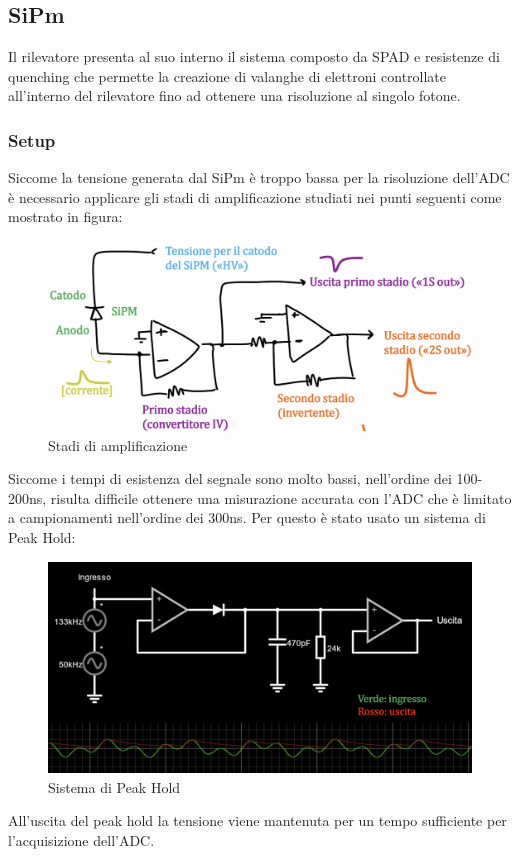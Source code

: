 \pagebreak
\subsection{SiPm}
Il rilevatore presenta al suo interno il sistema composto da SPAD e resistenze di quenching che permette la creazione di valanghe di elettroni controllate all'interno del rilevatore fino ad ottenere una risoluzione al singolo fotone.

\subsubsection{Setup}

Siccome la tensione generata dal SiPm è troppo bassa per la risoluzione dell'ADC è necessario applicare gli stadi di amplificazione studiati nei punti seguenti come mostrato in figura:

\begin{figure}[!h]
    \centering
    \includegraphics[width=0.5\linewidth]{Photomultiplier/assets/SiPm/SiPm_Stadi_Amp.png}
    \caption{Stadi di amplificazione}
    \label{fig:SiPm stadi di amp}
\end{figure}

Siccome i tempi di esistenza del segnale sono molto bassi, nell'ordine dei 100-200ns, risulta difficile ottenere una misurazione accurata con l'ADC che è limitato a campionamenti nell'ordine dei 300ns. Per questo è stato usato un sistema di Peak Hold:

\begin{figure}[!h]
    \centering
    \includegraphics[width=0.5\linewidth]{Photomultiplier/assets/SiPm/SiPm_Peak_hold.png}
    \caption{Sistema di Peak Hold}
\end{figure}

All'uscita del peak hold la tensione viene mantenuta per un tempo sufficiente per l'acquisizione dell'ADC.


